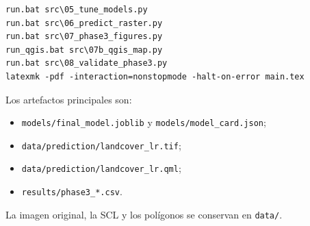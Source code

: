 \documentclass{article}
\begin{document}
\begin{verbatim}
run.bat src\05_tune_models.py
run.bat src\06_predict_raster.py
run.bat src\07_phase3_figures.py
run_qgis.bat src\07b_qgis_map.py
run.bat src\08_validate_phase3.py
latexmk -pdf -interaction=nonstopmode -halt-on-error main.tex
\end{verbatim}

Los artefactos principales son:
\begin{itemize}
 \item \texttt{models/final\_model.joblib} y \texttt{models/model\_card.json};
 \item \texttt{data/prediction/landcover\_lr.tif};
 \item \texttt{data/prediction/landcover\_lr.qml};
 \item \texttt{results/phase3\_*.csv}.
\end{itemize}
La imagen original, la SCL y los polígonos se conservan en \texttt{data/}.

\printbibliography
\end{document}
